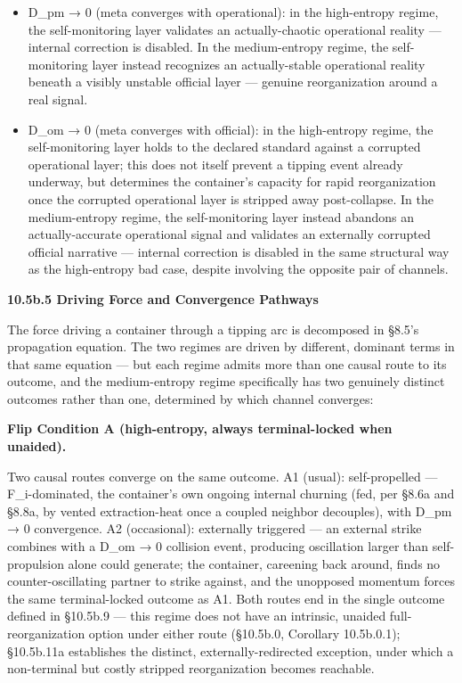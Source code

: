 \documentclass[
]{article}
\begin{document}
\begin{itemize}
\item
  D\_pm → 0 (meta converges with operational): in the high-entropy
  regime, the self-monitoring layer validates an actually-chaotic
  operational reality --- internal correction is disabled. In the
  medium-entropy regime, the self-monitoring layer instead recognizes an
  actually-stable operational reality beneath a visibly unstable
  official layer --- genuine reorganization around a real signal.
\item
  D\_om → 0 (meta converges with official): in the high-entropy regime,
  the self-monitoring layer holds to the declared standard against a
  corrupted operational layer; this does not itself prevent a tipping
  event already underway, but determines the container's capacity for
  rapid reorganization once the corrupted operational layer is stripped
  away post-collapse. In the medium-entropy regime, the self-monitoring
  layer instead abandons an actually-accurate operational signal and
  validates an externally corrupted official narrative --- internal
  correction is disabled in the same structural way as the high-entropy
  bad case, despite involving the opposite pair of channels.
\end{itemize}

\textbf{10.5b.5 Driving Force and Convergence Pathways}

The force driving a container through a tipping arc is decomposed in
§8.5's propagation equation. The two regimes are driven by different,
dominant terms in that same equation --- but each regime admits more
than one causal route to its outcome, and the medium-entropy regime
specifically has two genuinely distinct outcomes rather than one,
determined by which channel converges:

\textbf{Flip Condition A (high-entropy, always terminal-locked when
unaided).}

Two causal routes converge on the same outcome. A1 (usual):
self-propelled --- F\_i-dominated, the container's own ongoing internal
churning (fed, per §8.6a and §8.8a, by vented extraction-heat once a
coupled neighbor decouples), with D\_pm → 0 convergence. A2
(occasional): externally triggered --- an external strike combines with
a D\_om → 0 collision event, producing oscillation larger than
self-propulsion alone could generate; the container, careening back
around, finds no counter-oscillating partner to strike against, and the
unopposed momentum forces the same terminal-locked outcome as A1. Both
routes end in the single outcome defined in §10.5b.9 --- this regime
does not have an intrinsic, unaided full-reorganization option under
either route (§10.5b.0, Corollary 10.5b.0.1); §10.5b.11a establishes the
distinct, externally-redirected exception, under which a non-terminal
but costly stripped reorganization becomes reachable.
\end{document}
